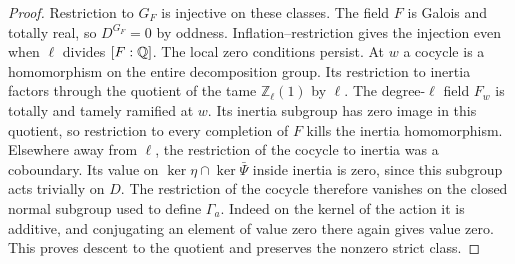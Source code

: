 \documentclass[a4paper,11pt]{article}
\theoremstyle{definition}
\theoremstyle{remark}
\newcommand{\ZZ}{\mathbb Z}\newcommand{\ord}{\operatorname{ord}}
\numberwithin{equation}{section}
\begin{document}
\begin{proof}
Restriction to \(G_F\) is injective on these classes.
The field \(F\) is Galois and totally real, so \(D^{G_F}=0\)
by oddness. Inflation--restriction gives the injection even
when \(\ell\) divides \([F:\mathbb Q]\). The local zero conditions
persist. At \(w\) a cocycle is a homomorphism on the entire
decomposition group. Its restriction to inertia factors through
the quotient of the tame \(\ZZ_\ell(1)\) by \(\ell\).
The degree-\(\ell\) field \(F_w\) is totally and tamely ramified
at \(w\). Its inertia subgroup has zero image in this quotient,
so restriction to every completion of \(F\) kills the inertia
homomorphism. Elsewhere away from \(\ell\), the restriction of
the cocycle to inertia was a coboundary. Its value on
\(\ker\eta\cap\ker\bar\Psi\) inside inertia is zero, since
this subgroup acts trivially on \(D\). The restriction of the
cocycle therefore vanishes on the closed normal subgroup used
to define \(\Gamma_a\). Indeed on the kernel of the action it
is additive, and conjugating an element of value zero there
again gives value zero. This proves descent to the quotient
and preserves the nonzero strict class.
\end{proof}
\end{document}
